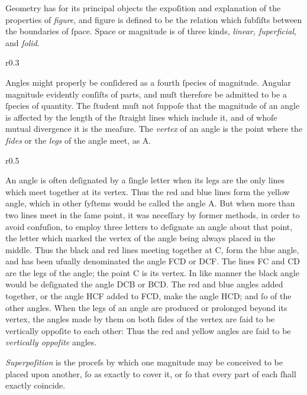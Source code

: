 Geometry has for its principal objects the expoſition and explanation of the properties of \textit{figure}, and figure is defined to be the relation which ſubſiſts between the boundaries of ſpace. Space or magnitude is of three kinds, \textit{linear, ſuperficial}, and \textit{ſolid}.

\begin{wrapfigure}{r}{0.3\textwidth}
    \centering
    
\end{wrapfigure}
Angles might properly be conſidered as a fourth ſpecies of magnitude. Angular magnitude evidently conſiſts of parts, and muſt therefore be admitted to be a ſpecies of quantity. The ſtudent muſt not ſuppoſe that the magnitude of an angle is affected by the length of the ſtraight lines which include it, and of whoſe mutual divergence it is the meaſure. The \textit{vertex} of an angle is the point where the \textit{ſides} or the \textit{legs} of the angle meet, as A.

\begin{wrapfigure}{r}{0.5\textwidth}
    \centering
    
\end{wrapfigure}
An angle is often deſignated by a ſingle letter when its legs are the only lines which meet together at its vertex. Thus the red and blue lines form the yellow angle, which in other ſyſtems would be called the angle A. But when more than two lines meet in the ſame point, it was neceſſary by former methods, in order to avoid confuſion, to employ three letters to deſignate an angle about that point, the letter which marked the vertex of the angle being always placed in the middle.  Thus the black and red lines meeting together at C, form the blue angle, and has been uſually denominated the angle FCD or DCF. The lines FC and CD are the legs of the angle; the point C is its vertex. In like manner the black angle would be deſignated the angle DCB or BCD. The red and blue angles added together, or the angle HCF added to FCD, make the angle HCD; and ſo of the other angles.  When the legs of an angle are produced or prolonged beyond its vertex, the angles made by them on both ſides of the vertex are ſaid to be vertically oppoſite to each other: Thus the red and yellow angles are ſaid to be \textit{vertically oppoſite} angles.

\textit{Superpoſition} is the proceſs by which one magnitude may be conceived to be placed upon another, ſo as exactly to cover it, or ſo that every part of each ſhall exactly coincide.

